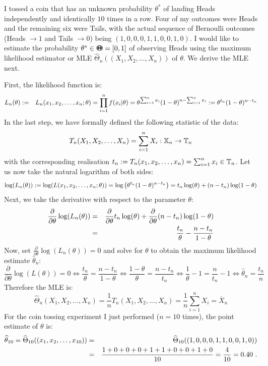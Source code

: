 \begin{example}\label{EX:CoinTossingML}
I tossed a coin that has an unknown probability $\theta^*$ of landing Heads independently and identically $10$ times in a row.  Four of my outcomes were Heads and the remaining six were Tails, with the actual sequence of Bernoulli outcomes (Heads $\to 1$ and Tails $\to 0$) being $(1,0,0,0,1,1,0,0,1,0)$.  I would like to estimate the probability $\theta^* \in {\Theta}\mspace{-11 mu}{\Theta} = [0,1]$ of observing Heads using the maximum likelihood estimator or MLE $\widehat{\Theta}_n((X_1,X_2,\ldots,X_n))$ of $\theta$. We derive the MLE next.

First, the likelihood function is:
\begin{eqnarray}
L_n(\theta) &:=& L_n(x_1,x_2,\ldots,x_n; \theta)  =  \prod_{i=1}^n f(x_i|\theta) = \theta^{\sum_{i=1}^n x_i} (1-\theta)^ {n-\sum_{i=1}^n x_i} := \theta^{t_n} (1-\theta)^{n-t_n} \notag 
\end{eqnarray}
In the last step, we have formally defined the following statistic of the data: 
$$T_n(X_1,X_2,\ldots,X_n)=\sum_{i=1}^n X_i :  \mathbb{X}_n \rightarrow \mathbb{T}_n$$ with the corresponding realisation $t_n := T_n(x_1,x_2,\ldots,x_n)=\sum_{i=1}^n x_i \in \mathbb{T}_n$.  Let us now take the natural logarithm of both sides:
\begin{eqnarray}
\log(L_n(\theta)) := \log(L(x_1,x_2,\ldots,x_n; \theta))   
= \log \left( \theta^{t_n} (1-\theta)^ {n-t_n} \right) 
= t_n \log(\theta) + (n-t_n) \log(1-\theta) \notag
\end{eqnarray}
Next, we take the derivative with respect to the parameter $\theta$:
\begin{eqnarray}
\frac{\partial}{\partial \theta} \log(L_n(\theta)) 
&=& \frac{\partial}{\partial \theta}  t_n \log(\theta) + \frac{\partial}{\partial \theta}  (n-t_n) \log(1-\theta) \notag \\
&=& \frac{t_n}{\theta} - \frac{n-t_n}{1-\theta} \notag
\end{eqnarray}
Now, set $\frac{\partial}{\partial \theta} \log(L_n(\theta))=0$ and solve for $\theta$ to obtain the maximum likelihood estimate  $\widehat{\theta}_n$:
\[
\frac{\partial}{\partial \theta} \log(L(\theta)) = 0 \iff  
\frac{t_n}{\theta} = \frac{n-t_n}{1-\theta} \iff
\frac{1-\theta}{\theta} = \frac{n-t_n}{t_n} \iff
\frac{1}{\theta}-1 = \frac{n}{t_n}-1 \iff \widehat{\theta}_n = \frac{t_n}{n}
\]
Therefore the MLE is:
\[
\widehat{\Theta}_n(X_1,X_2,\ldots,X_n) = \frac{1}{n}T_n(X_1,X_2,\ldots,X_n) = \frac{1}{n} \sum_{i=1}^n X_i = \overline{X}_n
\]
For the coin tossing experiment I just performed ($n=10$ times), the point estimate of $\theta$ is:
\begin{eqnarray}
\widehat{\theta}_{10} = \widehat{\Theta}_{10}((x_1,x_2,\ldots,x_{10})) 
&=&\widehat{\Theta}_{10}((1,0,0,0,1,1,0,0,1,0)) \notag \\
&=& \frac{1+0+0+0+1+1+0+0+1+0}{10}=\frac{4}{10}=0.40 \notag \ .
\end{eqnarray}
\end{example}

